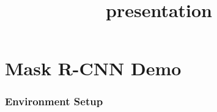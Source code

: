 \documentclass[11pt]{article}
\title{presentation}
\begin{document}
    
    
    \maketitle
    
    

    
    \hypertarget{mask-r-cnn-demo}{%
\section{Mask R-CNN Demo}\label{mask-r-cnn-demo}}

    \hypertarget{environment-setup}{%
\subsubsection{Environment Setup}\label{environment-setup}}
\end{document}
